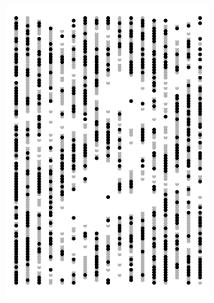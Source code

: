\documentclass{uwstat572}
\begin{document}
\begin{figure}[H]
	\centering
	\begin{subfigure}[b]{0.24\textwidth}
		\includegraphics[width=\textwidth]{figures/figure_5a.png}
		\caption{}
		\label{fig:week_35}
	\end{subfigure}
	\hfill
	\begin{subfigure}[b]{0.24\textwidth}

\end{subfigure}
\end{figure}
\end{document}
